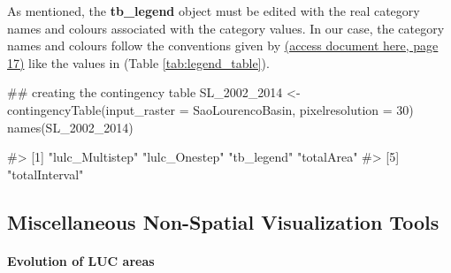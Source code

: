 As mentioned, the \textbf{tb\_legend} object must be edited with the
real category names and colours associated with the category values. In
our case, the category names and colours follow the conventions given by
\citep{sospantanal2015}
\href{https://www.embrapa.br/documents/1354999/1529097/BAP+-+Mapeamento+da+Bacia+do+Alto+Paraguai+-+estudo+completo/e66e3afb-2334-4511-96a0-af5642a56283}{(access
document here, page 17)} like the values in (Table
\ref{tab:legend_table}).

\begin{Schunk}
\begin{Sinput}
## creating the contingency table
SL_2002_2014 <- contingencyTable(input_raster = SaoLourencoBasin,
                                 pixelresolution = 30)
names(SL_2002_2014)
\end{Sinput}
\begin{Soutput}
#> [1] "lulc_Multistep" "lulc_Onestep"   "tb_legend"      "totalArea"     
#> [5] "totalInterval"
\end{Soutput}
\end{Schunk}

\FloatBarrier

\hypertarget{miscellaneous-non-spatial-visualization-tools}{%
\subsection{Miscellaneous Non-Spatial Visualization
Tools}\label{miscellaneous-non-spatial-visualization-tools}}

\hypertarget{evolution-of-luc-areas}{%
\paragraph{Evolution of LUC areas}\label{evolution-of-luc-areas}}

